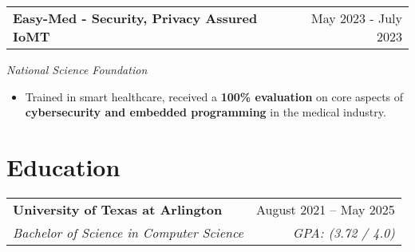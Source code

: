 \documentclass[a4paper,12pt]{article}
\begin{document}
\begin{tabularx}{\linewidth}{@{}Xr@{}}
\textbf{Easy-Med - Security, Privacy Assured IoMT} & \hfill May 2023 - July 2023
\end{tabularx}
\textit{National Science Foundation}
\vspace{-0.4em}
\begin{itemize}
    \item Trained in smart healthcare, received a \textbf{100\% evaluation} on core aspects of \textbf{cybersecurity and embedded programming} in the medical industry.
\end{itemize}

\vspace{-0.2em}
\section{Education}
\noindent
\begin{tabularx}{\linewidth}{@{}Xr@{}}
\textbf{University of Texas at Arlington} & August 2021 -- May 2025 \\
\textit{Bachelor of Science in Computer Science} & \textit{GPA: (3.72 / 4.0)} \\
\end{tabularx}

\vfill
\end{document}
